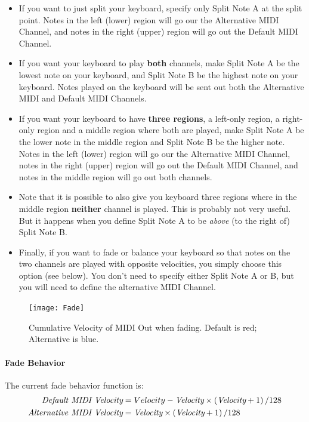 \documentclass{article}
\begin{document}
\begin{itemize}
\item  If you want to just split your keyboard, specify only Split Note A at the split point.  Notes in the left (lower) region will go our the Alternative MIDI Channel, and notes in the right (upper) region will go out the Default MIDI Channel.

\item If you want your keyboard to play {\bf both} channels, make Split Note A be the lowest note on your keyboard, and Split Note B be the highest note on your keyboard.    Notes played on the keyboard will be sent out both the Alternative MIDI and Default MIDI Channels. 

\item If you want your keyboard to have {\bf three regions}, a left-only region, a right-only region and a middle region where both are played, make Split Note A be the lower note in the middle region and Split Note B be the higher note.   Notes in the left (lower) region will go our the Alternative MIDI Channel, notes in the right (upper) region will go out the Default MIDI Channel, and notes in the middle region will go out both channels.

\item Note that it is possible to also give you keyboard three regions where in the middle region {\bf neither} channel is played.  This is probably not very useful.  But it happens when you define Split Note A to be {\it above} (to the right of) Split Note B.

\item Finally, if you want to fade or balance your keyboard so that notes on the two channels are played with opposite velocities, you simply choose this option (see below).  You don't need to specify either Split Note A or B, but you will need to define the alternative MIDI Channel.
\end{itemize}

\begin{figure}
\vspace{-3em}\texttt{[image: Fade]}
\vspace{-2em}\caption{\small Cumulative Velocity of MIDI Out when fading.  Default is {\color{red}red}; Alternative is {\color{blue} blue}.}
\vspace{-3em}
\label{splitter}
\end{figure}

\paragraph{Fade Behavior}  The current fade behavior function is:
\[
\begin{split}
\text{\it Default MIDI Velocity} &= Velocity - \text{\it Velocity} \times \left( \text{\it Velocity} + 1 \right) / 128\\
\text{\it Alternative MIDI Velocity} &= \text{\it Velocity} \times \left( \text{\it Velocity} + 1 \right) / 128
\end{split}
\]
\end{document}
